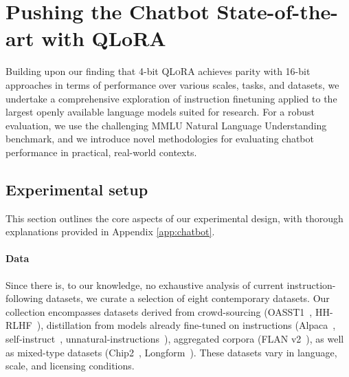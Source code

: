 \section{Pushing the Chatbot State-of-the-art with QLoRA}
\label{sec:pushing}
Building upon our finding that 4-bit \textsc{QLoRA} achieves parity with 16-bit approaches in terms of performance over various scales, tasks, and datasets, we undertake a comprehensive exploration of instruction finetuning applied to the largest openly available language models suited for research. For a robust evaluation, we use the challenging MMLU Natural Language Understanding benchmark, and we introduce novel methodologies for evaluating chatbot performance in practical, real-world contexts.

\subsection{Experimental setup}
This section outlines the core aspects of our experimental design, with thorough explanations provided in Appendix \ref{app:chatbot}.

\paragraph{Data} Since there is, to our knowledge, no exhaustive analysis of current instruction-following datasets, we curate a selection of eight contemporary datasets. Our collection encompasses datasets derived from crowd-sourcing (OASST1~\citep{kopf2023openassistant}, HH-RLHF~\citep{bai2022training}), distillation from models already fine-tuned on instructions (Alpaca~\citep{alpaca}, self-instruct~\citep{wang2022self}, unnatural-instructions~\citep{honovich2022unnatural}), aggregated corpora (FLAN v2~\citep{chung2022scaling}), as well as mixed-type datasets (Chip2~\citep{laion2023}, Longform~\citep{koksal2023longform}). These datasets vary in language, scale, and licensing conditions.

